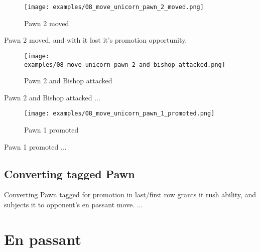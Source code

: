 \noindent
\begin{figure}[h]
\texttt{[image: examples/08\_move\_unicorn\_pawn\_2\_moved.png]}
\caption{Pawn 2 moved}
\label{fig:08_move_unicorn_pawn_2_moved}
\end{figure}

Pawn 2 moved, and with it lost it's promotion opportunity.

\clearpage %

\noindent
\begin{figure}[h]
\texttt{[image: examples/08\_move\_unicorn\_pawn\_2\_and\_bishop\_attacked.png]}
\caption{Pawn 2 and Bishop attacked}
\label{fig:08_move_unicorn_pawn_2_and_bishop_attacked}
\end{figure}

Pawn 2 and Bishop attacked ...

\clearpage %

\noindent
\begin{figure}[h]
\texttt{[image: examples/08\_move\_unicorn\_pawn\_1\_promoted.png]}
\caption{Pawn 1 promoted}
\label{fig:08_move_unicorn_pawn_1_promoted}
\end{figure}

Pawn 1 promoted ...

\clearpage %

\subsection*{Converting tagged Pawn}

Converting Pawn tagged for promotion in last/first row grants it rush ability,
and subjects it to opponent's en passant move. ...

\clearpage %

\section*{En passant}

